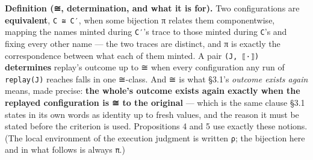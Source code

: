 \documentclass[
]{article}
\begin{document}
\textbf{Definition (≅, determination, and what it is for).} Two
configurations are \textbf{equivalent}, \texttt{C\ ≅\ C′}, when some
bijection π relates them componentwise, mapping the names minted during
\texttt{C′}'s trace to those minted during \texttt{C}'s and fixing every
other name --- the two traces are distinct, and π is exactly the
correspondence between what each of them minted. A pair
\texttt{(J,\ ⟦·⟧)} \textbf{determines} replay's outcome up to ≅ when
every configuration any run of \texttt{replay(J)} reaches falls in one
≅-class. And ≅ is what §3.1's \emph{outcome exists again} means, made
precise: \textbf{the whole's outcome exists again exactly when the
replayed configuration is ≅ to the original} --- which is the same
clause §3.1 states in its own words as identity up to fresh values, and
the reason it must be stated before the criterion is used. Propositions
4 and 5 use exactly these notions. (The local environment of the
execution judgment is written \texttt{ρ}; the bijection here and in what
follows is always \texttt{π}.)
\end{document}

